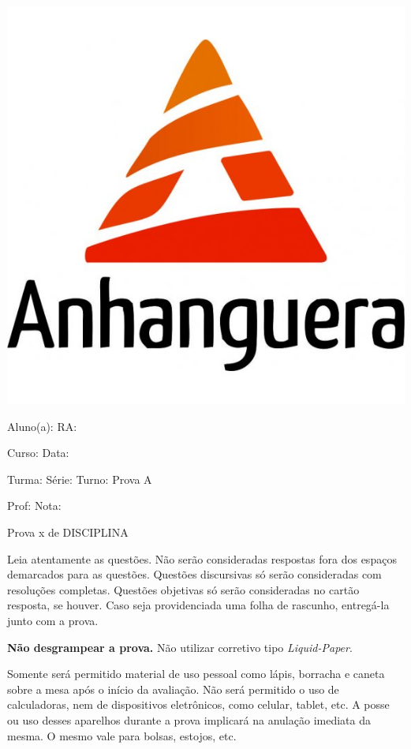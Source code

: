 \documentclass[a4paper]{article}
\begin{document}
\noindent\parbox[c]{.15\textwidth}{\includegraphics[width=.15\textwidth]{logo}}\hfill
\parbox[c]{.825\textwidth}{\raggedright%
{Aluno(a): \underline{\hspace{8.5cm}} RA: \underline{\hspace{2.3cm}}\par}
{Curso: \underline{\hspace{8.95cm}} Data: \underline{\hspace{2cm}}\par}
{Turma: \underline{\hspace{2cm}} Série: \underline{\hspace{2cm}}
  Turno: \underline{\hspace{2.5cm}} Prova A\par}
{Prof: \underline{\hspace{9.15cm}} Nota: \underline{\hspace{2cm}}\par}

\vspace{10pt}
}

{\large Prova x de DISCIPLINA}

\vspace{10pt}


Leia atentamente as questões. Não serão consideradas respostas fora
dos espaços demarcados para as questões. Questões discursivas só serão
consideradas com resoluções completas. Questões objetivas só serão
consideradas no cartão resposta, se houver. Caso seja providenciada
uma folha de rascunho, entregá-la junto com a prova.

{\bf Não desgrampear a prova.} Não utilizar corretivo tipo {\em
  Liquid-Paper}.

Somente será permitido material de uso pessoal como lápis, borracha e
caneta sobre a mesa após o início da avaliação. Não será permitido o
uso de calculadoras, nem de dispositivos eletrônicos, como celular,
tablet, etc. A posse ou uso desses aparelhos durante a prova implicará
na anulação imediata da mesma. O mesmo vale para bolsas, estojos, etc.
\end{document}
